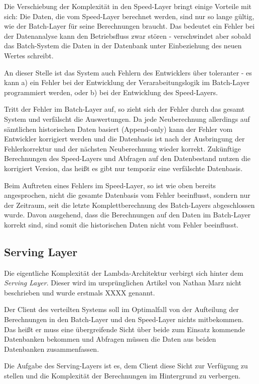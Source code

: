 \documentclass[a4paper,11pt]{scrartcl}
\begin{document}
  Die Verschiebung der Komplexität in den Speed-Layer bringt einige Vorteile mit
  sich: Die Daten, die vom Speed-Layer berechnet werden, sind nur so lange
  gültig, wie der Batch-Layer für seine Berechnungen braucht. Das bedeutet ein
  Fehler bei der Datenanalyse kann den Betriebsfluss zwar stören - verschwindet
  aber sobald das Batch-System die Daten in der Datenbank unter Einbeziehung des
  neuen Wertes schreibt.

  An dieser Stelle ist das System auch Fehlern des Entwicklers über toleranter -
  es kann a) ein Fehler bei der Entwicklung der Verarabeitungslogik im
  Batch-Layer programmiert werden, oder b) bei der Entwicklung des Speed-Layers.

  Tritt der Fehler im Batch-Layer auf, so zieht sich der Fehler durch das gesamt
  System und verfälscht die Auswertungen. Da jede Neuberechnung allerdings auf
  sämtlichen historischen Daten basiert (Append-only) kann der Fehler vom
  Entwickler korrigiert werden und die Datenbasis ist nach der Ausbringung der
  Fehlerkorrektur und der nächsten Neuberechnung wieder korrekt. Zukünftige
  Berechnungen des Speed-Layers und Abfragen auf den Datenbestand nutzen die
  korrigiert Version, das heißt es gibt nur temporär eine verfälschte Datenbasis.

  Beim Auftreten eines Fehlers im Speed-Layer, so ist wie oben bereits
  angesprochen, nicht die gesamte Datenbasis vom Fehler beeinflusst, sondern nur
  der Zeitraum, seit die letzte Komplettberechnung des Batch-Layers abgeschlossen
  wurde. Davon ausgehend, dass die Berechnungen auf den Daten im Batch-Layer
  korrekt sind, sind somit die historischen Daten nicht vom Fehler beeinflusst.

  \subsection{Serving Layer}
  Die eigentliche Komplexität der Lambda-Architektur verbirgt sich hinter dem
  \textit{Serving Layer}. Dieser wird im ursprünglichen Artikel von Nathan Marz
  nicht beschrieben und wurde erstmals XXXX genannt. 

  Der Client des verteilten Systems soll im Optimalfall von der Aufteilung der
  Berechnungen in den Batch-Layer und den Speed-Layer nichts mitbekommen. Das
  heißt er muss eine übergreifende Sicht über beide zum Einsatz kommende
  Datenbanken bekommen und Abfragen müssen die Daten aus beiden Datenbanken
  zusammenfassen.

  Die Aufgabe des Serving-Layers ist es, dem Client diese Sicht zur Verfügung zu
  stellen und die Komplexität der Berechnungen im Hintergrund zu verbergen.
\end{document}

